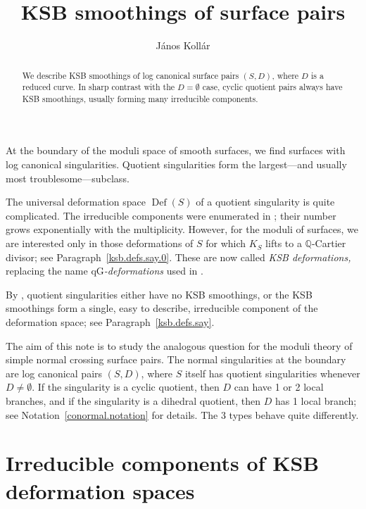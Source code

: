 \documentclass{amsart}
\theoremstyle{definition}
\theoremstyle{remark}
\newcommand{\q}[0]{{\mathbb Q}}
\newcommand{\qg}[0]{\ensuremath{\mathrm{qG}}}
\newcommand{\defsp}[0]{\operatorname{Def}}
\begin{document}


\title{KSB smoothings of surface pairs}
        \author{J\'anos Koll\'ar}

        \begin{abstract}  We describe KSB smoothings of log canonical surface  pairs  $(S, D)$, where $D$ is a reduced curve. In sharp contrast with the $D=\emptyset$ case, cyclic quotient  pairs  always have
          KSB smoothings, usually forming many irreducible components.
        \end{abstract}



        \maketitle

        \tableofcontents

At the boundary of the moduli space of smooth surfaces, we find surfaces with log canonical singularities. Quotient singularities form the largest---and usually most troublesome---subclass.

 The universal deformation space $\defsp(S)$ of a quotient singularity is quite complicated. The irreducible components were enumerated in \cite{ksb, MR1129040}; their number grows exponentially with the multiplicity. 
However, for the moduli of surfaces, we are interested only in those deformations of $S$ for which $K_S$ lifts to a $\q$-Cartier divisor; see Paragraph~\ref{ksb.defs.say.0}.
These are now called {\it KSB deformations,} replacing the name  {\it  \qg-deformations} used in \cite{ksb}. 

By \cite{wah-loo, ksb},  quotient singularities either have no KSB smoothings, or 
the  KSB smoothings form a single,  easy to describe, irreducible component of the deformation space;  see Paragraph~\ref{ksb.defs.say}.




The aim of this note is to study the analogous question for  the moduli theory of  simple normal crossing   surface pairs. 
The normal singularities at the boundary are log canonical pairs $(S, D)$, where $S$ itself has quotient singularities whenever $D\neq \emptyset$. If the singularity is a cyclic quotient, then $D$ can have 1 or 2 local branches, and if the singularity is a dihedral quotient, then $D$  has 1 local branch; 
see  Notation~\ref{conormal.notation} for details.
The 3  types behave quite differently.


\section{Irreducible components of KSB deformation spaces}
\end{document}
